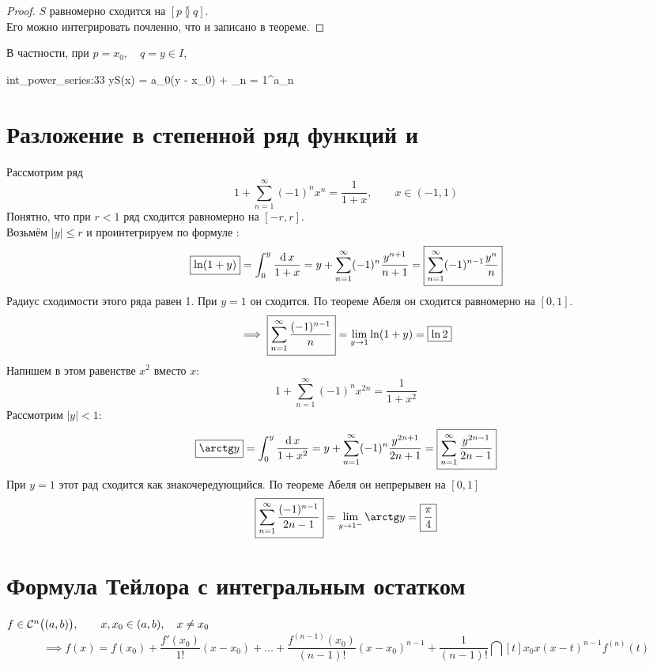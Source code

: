 \begin{proof}
	$ S $ равномерно сходится на $ [p \between q] $. \\
	Его можно интегрировать почленно, что и записано в теореме.
\end{proof}

\begin{statement}
	В частности, при $ p = x_0, \quad q = y \in I $,
	\begin{equ}{int_power_series:33}
		y{S(x)} = a_0(y - x_0) + \sum_{n = 1}^\infty a_n 
	\end{equ}
\end{statement}

\section{Разложение в степенной ряд функций  и }

Рассмотрим ряд
$$ 1 + \sum_{n = 1}^\infty (-1)^nx^n = \frac1{1 + x}, \qquad x \in (-1, 1) $$
Понятно, что при $ r < 1 $ ряд сходится равномерно на $ [-r, r] $. \\
Возьмём $ |y| \le r $ и проинтегрируем по формуле :
$$ \boxed{\ln (1 + y)} = \dfint0y{1 + x} = y + \sum_{n = 1}^\infty (-1)^n \frac{y^{n + 1}}{n + 1} = \boxed{\sum_{n = 1}^\infty (-1)^{n - 1} \frac{y^n}n} $$
Радиус сходимости этого ряда равен 1. При $ y = 1 $ он сходится. По теореме Абеля он сходится равномерно на $ [0, 1] $.
$$ \implies \boxed{\sum_{n = 1}^\infty \frac{(-1)^{n - 1}}n} = \liml{y \to 1} \ln(1 + y) = \boxed{\ln 2} $$
Напишем в этом равенстве $ x^2 $ вместо $ x $:
$$ 1 + \sum_{n = 1}^\infty (-1)^n x^{2n} = \frac1{1 + x^2} $$
Рассмотрим $ |y| < 1 $:
$$ \boxed{\arctg y} = \dfint0y{1 + x^2} = y + \sum_{n = 1}^\infty (-1)^n \frac{y^{2n + 1}}{2n + 1} = \boxed{\sum_{n = 1}^\infty \frac{y^{2n - 1}}{2n - 1}} $$
При $ y = 1 $ этот рад сходится как знакочередующийся. По теореме Абеля он непрерывен на $ [0, 1] $
$$ \boxed{\sum_{n = 1}^\infty \frac{(-1)^{n - 1}}{2n - 1}} = \liml{y \to 1^-} \arctg y = \boxed{\frac\pi4} $$

\section{Формула Тейлора с интегральным остатком}

\begin{theorem}
	$ f \in \Cont[n]{(a, b)}, \qquad x, x_0 \in (a, b), \quad x \ne x_0 $
	$$ \implies f(x) = f(x_0) + \frac{f'(x_0)}{1!}(x - x_0) + \dots + \frac{f^{(n - 1)}(x_0)}{(n - 1)!}(x - x_0)^{n - 1} + \frac1{(n - 1)!} \dint[t]{x_0}x{(x - t)^{n - 1}f^{(n)}(t)} $$
\end{theorem}

